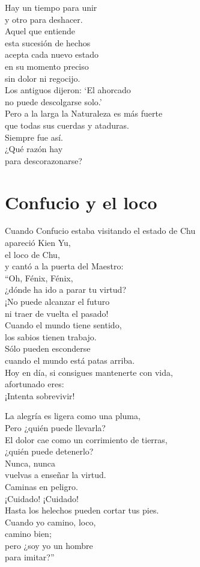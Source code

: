 \documentclass[hidelinks]{memoir}
\begin{document}
	Hay un tiempo para unir\\
	y otro para deshacer.\\
	Aquel que entiende\\
	esta sucesión de hechos\\
	acepta cada nuevo estado\\
	en su momento preciso\\
	sin dolor ni regocijo.\\
	Los antiguos dijeron: `El ahorcado\\
	no puede descolgarse solo.'\\
	Pero a la larga la Naturaleza es más fuerte\\
	que todas sus cuerdas y ataduras.\\
	Siempre fue así.\\
	¿Qué razón hay\\
	para descorazonarse?
	
	\chapter*{Confucio y el loco}
	
	Cuando Confucio estaba visitando el estado de Chu\\
	apareció Kien Yu,\\
	el loco de Chu,\\
	y cantó a la puerta del Maestro:\\
	``Oh, Fénix, Fénix,\\
	¿dónde ha ido a parar tu virtud?\\
	¡No puede alcanzar el futuro\\
	ni traer de vuelta el pasado!\\
	Cuando el mundo tiene sentido,\\
	los sabios tienen trabajo.\\
	Sólo pueden esconderse\\
	cuando el mundo está patas arriba.\\
	Hoy en día, si consigues mantenerte con vida,\\
	afortunado eres:\\
	¡Intenta sobrevivir!
	
	La alegría es ligera como una pluma,\\
	Pero ¿quién puede llevarla?\\
	El dolor cae como un corrimiento de tierras,\\
	¿quién puede detenerlo?\\
	Nunca, nunca\\
	vuelvas a enseñar la virtud.\\
	Caminas en peligro.\\
	¡Cuidado! ¡Cuidado!\\
	Hasta los helechos pueden cortar tus pies.\\
	Cuando yo camino, loco,\\
	camino bien;\\
	pero ¿soy yo un hombre\\
	para imitar?''
	
\end{document}
